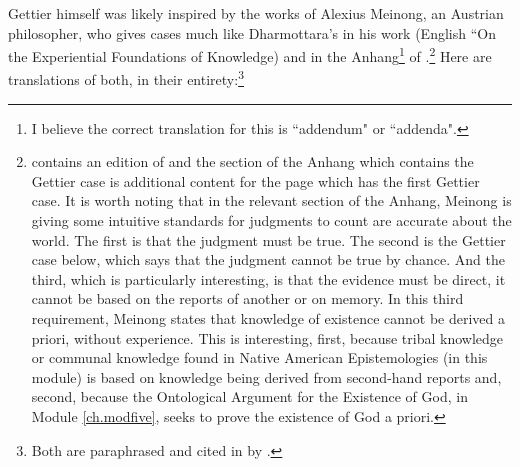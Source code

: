 Gettier himself was likely inspired by the works of Alexius Meinong, an Austrian philosopher, who gives cases much like Dharmottara's in his work  (English ``On the Experiential Foundations of Knowledge) and in the Anhang\footnote{I believe the correct translation for this is ``addendum" or ``addenda".} of .\footnote{ contains an edition of  and the section of the Anhang which contains the Gettier case is additional content for the page which has the first Gettier case. It is worth noting that in the relevant section of the Anhang, Meinong is giving some intuitive standards for judgments to count are accurate about the world. The first is that the judgment must be true. The second is the Gettier case below, which says that the judgment cannot be true by chance. And the third, which is particularly interesting, is that the evidence must be direct, it cannot be based on the reports of another or on memory. In this third requirement, Meinong states that knowledge of existence cannot be derived a priori, without experience. This is interesting, first, because tribal knowledge or communal knowledge found in Native American Epistemologies (in this module) is based on knowledge being derived from second-hand reports and, second, because the Ontological Argument for the Existence of God, in Module \ref{ch.modfive}, seeks to prove the existence of God a priori.} Here are translations of both, in their entirety:\footnote{Both are paraphrased and cited in  by \citeauthor{Chisholm1} \parencite[p. 92]{Chisholm1}.}


